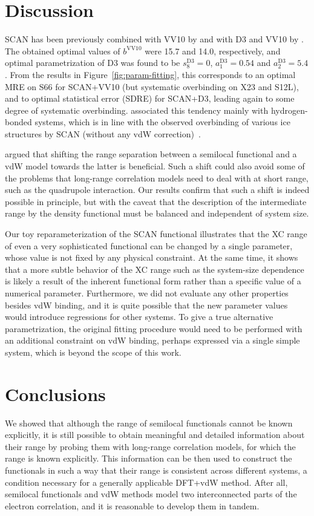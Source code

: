 \section{Discussion}

SCAN has been previously combined with VV10 by \citet{PengPRX16} and with D3 and VV10 by \citet{BrandenburgPRB16}.
The obtained optimal values of $b^\text{VV10}$ were 15.7 and 14.0, respectively, and optimal parametrization of D3 was found to be $s_8^\text{D3}=0$, $a_1^\text{D3}=0.54$ and $a_2^\text{D3}=5.4$.
From the results in Figure~\ref{fig:param-fitting}, this corresponds to an optimal MRE on S66 for SCAN+VV10 (but systematic overbinding on X23 and S12L), and to optimal statistical error (SDRE) for SCAN+D3, leading again to some degree of systematic overbinding.
\citet{BrandenburgPRB16} associated this tendency mainly with hydrogen-bonded systems, which is in line with the observed overbinding of various ice structures by SCAN (without any vdW correction)~\cite{ChenPRB16}.

\citet{PengPRX16} argued that shifting the range separation between a semilocal functional and a vdW model towards the latter is beneficial.
Such a shift could also avoid some of the problems that long-range correlation models need to deal with at short range, such as the quadrupole interaction.
Our results confirm that such a shift is indeed possible in principle, but with the caveat that the description of the intermediate range by the density functional must be balanced and independent of system size.

Our toy reparameterization of the SCAN functional illustrates that the XC range of even a very sophisticated functional can be changed by a single parameter, whose value is not fixed by any physical constraint.
At the same time, it shows that a more subtle behavior of the XC range such as the system-size dependence is likely a result of the inherent functional form rather than a specific value of a numerical parameter.
Furthermore, we did not evaluate any other properties besides vdW binding, and it is quite possible that the new parameter values would introduce regressions for other systems.
To give a true alternative parametrization, the original fitting procedure would need to be performed with an additional constraint on vdW binding, perhaps expressed via a single simple system, which is beyond the scope of this work.

\section{Conclusions}

We showed that although the range of semilocal functionals cannot be known explicitly, it is still possible to obtain meaningful and detailed information about their range by probing them with long-range correlation models, for which the range is known explicitly.
This information can be then used to construct the functionals in such a way that their range is consistent across different systems, a condition necessary for a generally applicable DFT+vdW method.
After all, semilocal functionals and vdW methods model two interconnected parts of the electron correlation, and it is reasonable to develop them in tandem.
